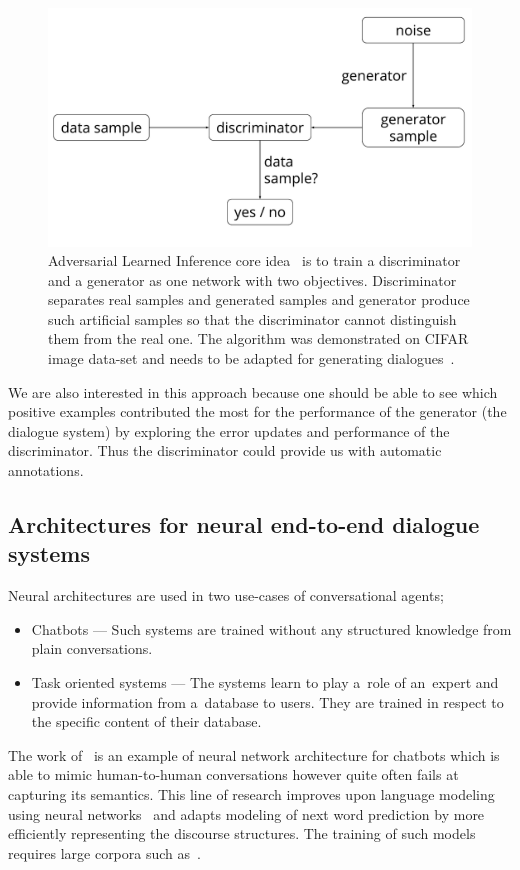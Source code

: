 \documentclass[11pt]{article}
\begin{document}
\begin{figure}[htb]
    \centering
    \includegraphics[width=0.8\linewidth]{gan_simple}
    \caption{Adversarial Learned Inference core idea~\cite{dumoulin_adversarially_2016} is to train a discriminator and a generator as one network with two objectives. 
    Discriminator separates real samples and generated samples and generator produce such artificial samples so that the discriminator cannot distinguish them from the real one. The algorithm was demonstrated on CIFAR image data-set and needs to be adapted for generating dialogues~\cite{krizhevsky_cifar-10_2014}.}
\label{fig:gan}
\end{figure}

We are also interested in this approach because one should be able to see which positive examples contributed the most for the performance of the generator (the dialogue system) by exploring the error updates and performance of the discriminator.
Thus the discriminator could provide us with automatic annotations. 

\subsection{Architectures for neural end-to-end dialogue systems}
\label{sub:nn_architectures}
Neural architectures are used in two use-cases of conversational agents;
\begin{itemize}
    \item Chatbots --- Such systems are trained without any structured knowledge from plain conversations.
    \item Task oriented systems --- The systems learn to play a~role of an~expert and provide information from a~database to users.
        They are trained in respect to the specific content of their database.
\end{itemize}

The work of~\cite{serban_multiresolution_2016} is an example of neural network architecture for chatbots which is able to mimic human-to-human conversations however quite often fails at capturing its semantics.
This line of research improves upon language modeling using neural networks~\cite{mikolov_efficient_2013} and adapts modeling of next word prediction by more efficiently representing the discourse structures.
The training of such models requires large corpora such as~\cite{lowe_ubuntu_2015}. 
\end{document}
